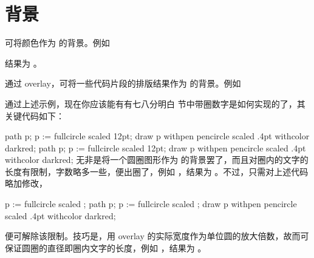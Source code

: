 \section{背景}

可将颜色作为 \type{\framed} 的背景。例如

\starttyping[option=TEX]
\stoptyping

\noindent 结果为 。

通过 overlay，可将一些代码片段的排版结果作为 \type{\framed} 的背景。例如

\starttyping[option=TEX]
\stoptyping

\blank

通过上述示例，现在你应该能有有七八分明白  节中带圈数字是如何实现的了，其关键代码如下：

\starttyping[option=TEX]
  path p;
  p := fullcircle scaled 12pt;
  draw p withpen pencircle scaled .4pt
         withcolor darkred;
\stopuseMPgraphic
{}
\def\fooframe#1{%
  \inframed[frame=off,background=rsquare]{#1}%
}
\stoptyping
{}
  path p;
  p := fullcircle scaled 12pt;
  draw p withpen pencircle scaled .4pt
         withcolor darkred;
\stopuseMPgraphic
{}
\def\fooframe#1{%
  \inframed[frame=off,background=rsquare]{#1}%
}
\noindent 无非是将一个圆圈图形作为 \type{\inframed} 的背景罢了，而且对圈内的文字的长度有限制，字数略多一些，便出圈了，例如 \type{\fooframe{123}}，结果为 \fooframe{123}。不过，只需对上述代码略加修改，

\starttyping[option=TEX]
  p := fullcircle scaled \overlaywidth;
\stoptyping
{}
  path p;
  p := fullcircle scaled \overlaywidth;
  draw p withpen pencircle scaled .4pt
         withcolor darkred;
\stopuseMPgraphic
{}
\def\fooframe#1{%
  \inframed[frame=off,background=rsquare]{#1}%
}

\noindent 便可解除该限制。技巧是，用 overlay 的实际宽度作为单位圆的放大倍数，故而可保证圆圈的直径即圈内文字的长度，例如 \type{\fooframe{我有一个大房子}}，结果为 \fooframe{我有一个大房子}。

